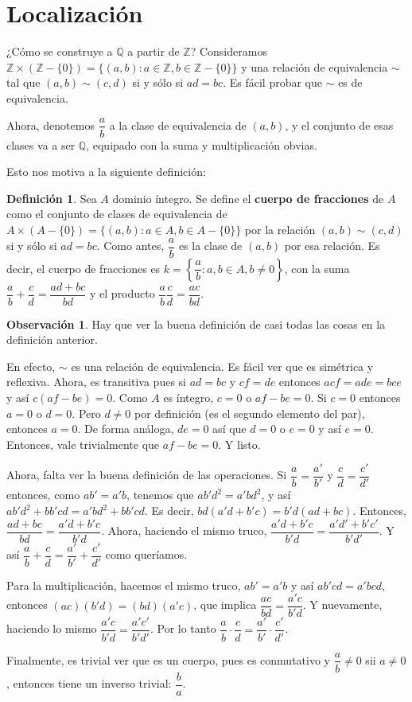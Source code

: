 \documentclass[12pt]{book}
\theoremstyle{definition}
\newtheorem{obs}[teo]{Observación}
\newtheorem{defn}[teo]{Definición}
\newcommand{\ZZ}{\mathbb{Z}}      %
\newcommand{\QQ}{\mathbb{Q}}
\begin{document}
\section{Localización}

¿Cómo se construye a $\QQ$ a partir de $\ZZ$? Consideramos $\ZZ\times (\ZZ-\{0\}) = \{(a,b) : a\in \ZZ , b\in \ZZ-\{0\}\}$ y una relación de equivalencia $\sim$ tal que $(a,b)\sim(c,d)$ si y sólo si $ad=bc$. Es fácil probar que $\sim$ es de equivalencia.

Ahora, denotemos $\dfrac{a}{b}$ a la clase de equivalencia de $(a,b)$, y el conjunto de esas clases va a ser $\QQ$, equipado con la suma y multiplicación obvias.

Esto nos motiva a la siguiente definición:

\begin{defn}
Sea $A$ dominio íntegro. Se define el \textbf{cuerpo de fracciones} de $A$ como el conjunto de clases de equivalencia de $A\times (A-\{0\})=\{(a,b) : a\in A, b\in A-\{0\}\}$ por la relación $(a,b)\sim(c,d)$ si y sólo si $ad=bc$. Como antes, $\dfrac{a}{b}$ es la clase de $(a,b)$ por esa relación. Es decir, el cuerpo de fracciones es $k=\left\{\dfrac{a}{b} : a,b\in A , b\neq 0\right\}$, con la suma $\dfrac{a}{b}+\dfrac{c}{d} = \dfrac{ad+bc}{bd}$ y el producto $\dfrac{a}{b}\dfrac{c}{d} = \dfrac{ac}{bd}$.
\end{defn}

\begin{obs}
Hay que ver la buena definición de casi todas las cosas en la definición anterior.

En efecto, $\sim$ es una relación de equivalencia. Es fácil ver que es simétrica y reflexiva. Ahora, es transitiva pues si $ad=bc$ y $cf=de$ entonces $acf=ade = bce$ y así $c(af-be)=0$. Como $A$ es íntegro, $c=0$ o $af-be=0$. Si $c=0$ entonces $a=0$ o $d=0$. Pero $d\neq 0$ por definición (es el segundo elemento del par), entonces $a=0$. De forma análoga, $de=0$ así que $d=0$ o $e=0$ y así $e=0$. Entonces, vale trivialmente que $af-be=0$. Y listo.

Ahora, falta ver la buena definición de las operaciones. Si $\dfrac{a}{b}=\dfrac{a'}{b'}$ y $\dfrac{c}{d}=\dfrac{c'}{d'}$ entonces, como $ab'=a'b$, tenemos que $ab'd^2 = a'bd^2$, y así $ab'd^2 + bb'cd = a'bd^2 + bb'cd$. Es decir, $bd(a'd + b'c) = b'd(ad+bc)$. Entonces, $\dfrac{ad+bc}{bd} = \dfrac{a'd+b'c}{b'd}$. Ahora, haciendo el mismo truco, $\dfrac{a'd+b'c}{b'd} = \dfrac{a'd'+b'c'}{b'd'}$. Y así $\dfrac{a}{b}+\dfrac{c}{d} = \dfrac{a'}{b'}+\dfrac{c'}{d'}$ como queríamos.

Para la multiplicación, hacemos el mismo truco, $ab' = a'b$ y así $ab'cd=a'bcd$, entonces $(ac)(b'd)=(bd)(a'c)$, que implica $\dfrac{ac}{bd}=\dfrac{a'c}{b'd}$. Y nuevamente, haciendo lo mismo $\dfrac{a'c}{b'd} = \dfrac{a'c'}{b'd'}$. Por lo tanto $\dfrac{a}{b}\cdot \dfrac{c}{d} = \dfrac{a'}{b'}\cdot \dfrac{c'}{d'}$.

Finalmente, es trivial ver que es un cuerpo, pues es conmutativo y $\dfrac{a}{b}\neq 0$ sii $a\neq 0$, entonces tiene un inverso trivial: $\dfrac{b}{a}$.

\end{obs}
\end{document}
